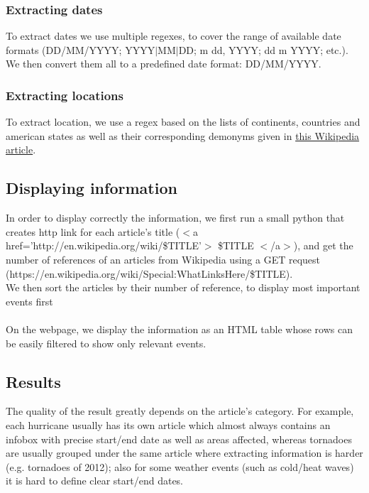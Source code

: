 \subsubsection{Extracting dates}
To extract dates we use multiple regexes, to cover the range of available date formats (DD/MM/YYYY; YYYY$|$MM$|$DD; m dd, YYYY; dd m YYYY; etc.). We then convert them all to a predefined date format: DD/MM/YYYY. 
\subsubsection{Extracting locations}
To extract location, we use a regex based on the lists of continents, countries and american states as well as their corresponding demonyms given in \href{http://en.wikipedia.org/wiki/List_of_adjectival_forms_of_place_names}{this Wikipedia article}.
\subsection{Displaying information}
In order to display correctly the information, we first run a small python that creates http link for each article's title ($<$a href='http://en.wikipedia.org/wiki/\$TITLE'$>$ \$TITLE $<$/a$>$), and get the number of references of an articles from Wikipedia using a GET request (https://en.wikipedia.org/wiki/Special:WhatLinksHere/\$TITLE).\\
We then sort the articles by their number of reference, to display most important events first\\\\
On the webpage, we display the information as an HTML table whose rows can be easily filtered to show only relevant events.
\subsection{Results}
The quality of the result greatly depends on the article's category. For example, each hurricane usually has its own article which almost always contains an infobox with precise start/end date as well as areas affected, whereas tornadoes are usually grouped under the same article where extracting information is harder (e.g. tornadoes of  2012); also for some weather events (such as cold/heat waves) it is hard to define clear start/end dates.
%
